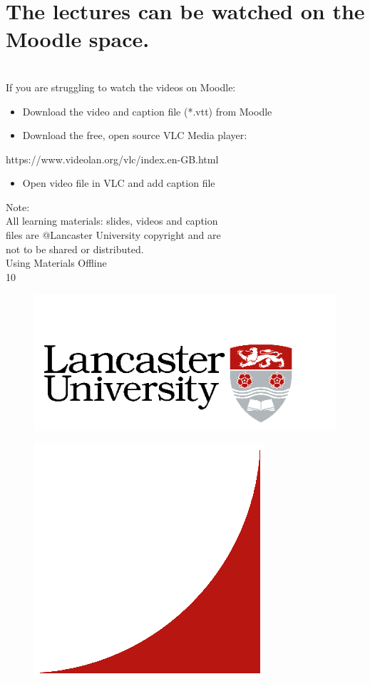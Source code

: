 \documentclass[12pt]{article}
\begin{document}
\section{The lectures can be watched on the Moodle space.}
\\
If you are struggling to watch the videos on Moodle:\\
\begin{itemize}
  \item Download the video and caption file (*.vtt) from Moodle
  \item Download the free, open source VLC Media player: 
\end{itemize}
https://www.videolan.org/vlc/index.en-GB.html\\
\begin{itemize}
  \item Open video file in VLC and add caption file
\end{itemize}
Note:\\
All learning materials: slides, videos and caption\\
files are @Lancaster University copyright and are \\
not to be shared or distributed.\\
Using Materials Offline\\
10\\
\begin{figure}[H]
\includegraphics[width=0.5\linewidth]{page1-image-1.png}
\end{figure}
\begin{figure}[H]
\includegraphics[width=0.5\linewidth]{page1-image-2.png}
\end{figure}
\end{document}

